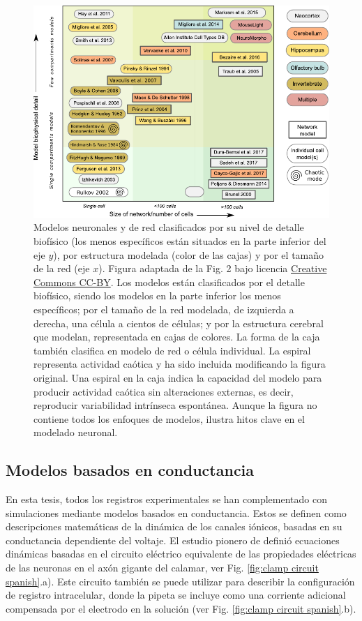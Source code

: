 \begin{figure}[bth!]
	\centering
	\includegraphics[width=\textwidth]{img/intro/models classification_v2.pdf}
	\caption{Modelos neuronales y de red clasificados por su nivel de detalle biofísico (los menos específicos están situados en la parte inferior del eje $y$), por estructura modelada (color de las cajas) y por el tamaño de la red (eje $x$). Figura adaptada de la Fig. 2 \parencite{gleeson_open_2019} bajo licencia \href{http://creativecommons.org/licenses/by/4.0/}{Creative Commons CC-BY}. Los modelos están clasificados por el detalle biofísico, siendo los modelos en la parte inferior los menos específicos; por el tamaño de la red modelada, de izquierda a derecha, una célula a cientos de células; y por la estructura cerebral que modelan, representada en cajas de colores. La forma de la caja también clasifica en modelo de red o célula individual. La espiral representa actividad caótica y ha sido incluida modificando la figura original. Una espiral en la caja indica la capacidad del modelo para producir actividad caótica sin alteraciones externas, es decir, reproducir variabilidad intrínseca espontánea. Aunque la figura no contiene todos los enfoques de modelos, ilustra hitos clave en el modelado neuronal.}
	\label{fig:models-classification spanish}
\end{figure}

\subsection{Modelos basados en conductancia}

En esta tesis, todos los registros experimentales se han complementado con simulaciones mediante modelos basados en conductancia. Estos se definen como descripciones matemáticas de la dinámica de los canales iónicos, basadas en su conductancia dependiente del voltaje. El estudio pionero de \textcite{hodgkin_quantitative_1952} definió ecuaciones dinámicas basadas en el circuito eléctrico equivalente de las propiedades eléctricas de las neuronas en el axón gigante del calamar, ver Fig. \ref{fig:clamp circuit spanish}.a). Este circuito también se puede utilizar para describir la configuración de registro intracelular, donde la pipeta se incluye como una corriente adicional compensada por el electrodo en la solución (ver Fig. \ref{fig:clamp circuit spanish}.b).


